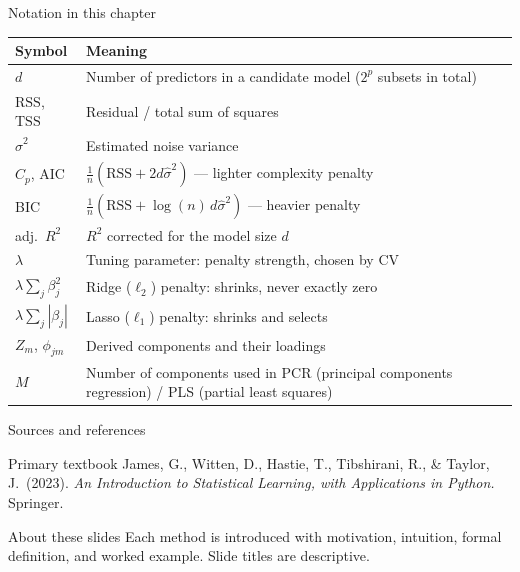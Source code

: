 \documentclass[aspectratio=169,11pt]{beamer}
\begin{document}
\begin{frame}{Notation in this chapter}
  \footnotesize
  \begin{center}
  \begin{tabular}{@{}ll@{}}
    \toprule
    \textbf{Symbol} & \textbf{Meaning} \\
    \midrule
    $d$ & Number of predictors in a candidate model ($2^p$ subsets in total) \\
    $\mathrm{RSS}$, $\mathrm{TSS}$ & Residual / total sum of squares \\
    $\hat\sigma^2$ & Estimated noise variance \\
    $C_p$, AIC & $\tfrac1n(\mathrm{RSS} + 2d\hat\sigma^2)$ --- lighter complexity penalty \\
    BIC & $\tfrac1n(\mathrm{RSS} + \log(n)\,d\hat\sigma^2)$ --- heavier penalty \\
    adj.\ $R^2$ & $R^2$ corrected for the model size $d$ \\
    $\lambda$ & Tuning parameter: penalty strength, chosen by CV \\
    $\lambda\sum_j \beta_j^2$ & Ridge ($\ell_2$) penalty: shrinks, never exactly zero \\
    $\lambda\sum_j |\beta_j|$ & Lasso ($\ell_1$) penalty: shrinks and selects \\
    $Z_m$, $\phi_{jm}$ & Derived components and their loadings \\
    $M$ & Number of components used in PCR (principal components regression) / PLS (partial least squares) \\
    \bottomrule
  \end{tabular}
  \end{center}
\end{frame}

\begin{frame}{Sources and references}
  \begin{block}{Primary textbook}
    James, G., Witten, D., Hastie, T., Tibshirani, R., \& Taylor, J.\ (2023).
    \emph{An Introduction to Statistical Learning, with Applications in
    Python.} Springer.
  \end{block}
  \begin{block}{About these slides}
    Each method is introduced with motivation, intuition, formal
    definition, and worked example. Slide titles are descriptive.
  \end{block}
\end{frame}
\end{document}
